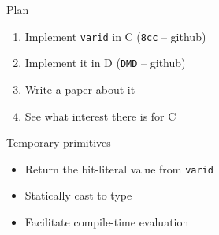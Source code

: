 \documentclass[xcolor=dvipsnames]{beamer}
\def\CC{{C\nolinebreak[4]\hspace{-.05em}\raisebox{.4ex}{\small\bf ++}}}
\begin{document}
\begin{frame}[fragile]{Plan}
  \begin{enumerate}
  \item Implement \texttt{varid} in C (\texttt{8cc} -- github) \vspace{5mm}
  \item Implement it in D (\texttt{DMD} -- github) \vspace{5mm}
  \item Write a paper about it \vspace{5mm}
  \item See what interest there is for \CC \vspace{5mm}
  \end{enumerate}
\end{frame}


\begin{frame}[fragile]{Temporary primitives}
  \begin{itemize}
  \item Return the bit-literal value from \texttt{varid}\vspace{5mm}
  \item Statically cast to type\vspace{5mm}
  \item Facilitate compile-time evaluation\vspace{5mm}
  \end{itemize}
\end{frame}
\end{document}
